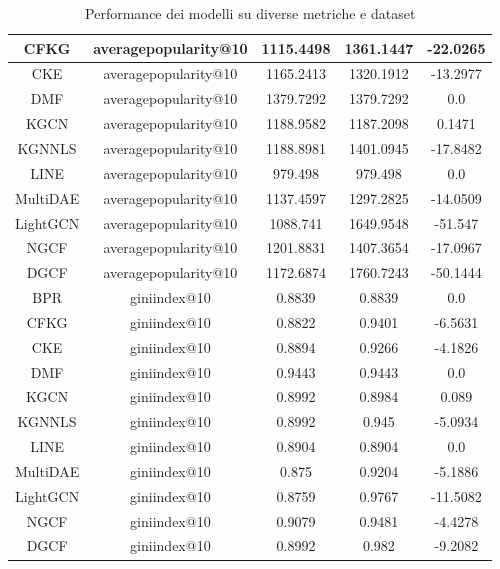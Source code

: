 \begin{table}[H]
{\begin{tabular}{|c|c|c|c|c|}
    CFKG & averagepopularity@10 & 1115.4498 & 1361.1447 & -22.0265 \\ \hline
    CKE & averagepopularity@10 & 1165.2413 & 1320.1912 & -13.2977 \\ \hline
    DMF & averagepopularity@10 & 1379.7292 & 1379.7292 & 0.0 \\ \hline
    KGCN & averagepopularity@10 & 1188.9582 & 1187.2098 & 0.1471 \\ \hline
    KGNNLS & averagepopularity@10 & 1188.8981 & 1401.0945 & -17.8482 \\ \hline
    LINE & averagepopularity@10 & 979.498 & 979.498 & 0.0 \\ \hline
    MultiDAE & averagepopularity@10 & 1137.4597 & 1297.2825 & -14.0509 \\ \hline
    LightGCN & averagepopularity@10 & 1088.741 & 1649.9548 & -51.547 \\ \hline
    NGCF & averagepopularity@10 & 1201.8831 & 1407.3654 & -17.0967 \\ \hline
    DGCF & averagepopularity@10 & 1172.6874 & 1760.7243 & -50.1444 \\ \hline
    BPR & giniindex@10 & 0.8839 & 0.8839 & 0.0 \\ \hline
    CFKG & giniindex@10 & 0.8822 & 0.9401 & -6.5631 \\ \hline
    CKE & giniindex@10 & 0.8894 & 0.9266 & -4.1826 \\ \hline
    DMF & giniindex@10 & 0.9443 & 0.9443 & 0.0 \\ \hline
    KGCN & giniindex@10 & 0.8992 & 0.8984 & 0.089 \\ \hline
    KGNNLS & giniindex@10 & 0.8992 & 0.945 & -5.0934 \\ \hline
    LINE & giniindex@10 & 0.8904 & 0.8904 & 0.0 \\ \hline
    MultiDAE & giniindex@10 & 0.875 & 0.9204 & -5.1886 \\ \hline
    LightGCN & giniindex@10 & 0.8759 & 0.9767 & -11.5082 \\ \hline
    NGCF & giniindex@10 & 0.9079 & 0.9481 & -4.4278 \\ \hline
    DGCF & giniindex@10 & 0.8992 & 0.982 & -9.2082 \\ \hline
\end{tabular}
    }
    \caption{Performance dei modelli su diverse metriche e dataset}
    \end{table}


